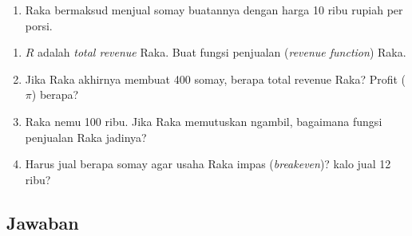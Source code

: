 \documentclass[
  letterpaper,
  DIV=11,
  numbers=noendperiod]{scrartcl}
\providecommand{\tightlist}{%
  \setlength{\itemsep}{0pt}\setlength{\parskip}{0pt}}\usepackage{longtable,booktabs,array}
\begin{document}
\begin{enumerate}
\def\labelenumi{\arabic{enumi}.}
\setcounter{enumi}{1}
\tightlist
\item
  Raka bermaksud menjual somay buatannya dengan harga 10 ribu rupiah per
  porsi.
\end{enumerate}

\begin{enumerate}
\def\labelenumi{\alph{enumi}.}
\tightlist
\item
  \(R\) adalah \emph{total revenue} Raka. Buat fungsi penjualan
  (\emph{revenue function}) Raka.
\item
  Jika Raka akhirnya membuat 400 somay, berapa total revenue Raka?
  Profit (\(\pi\)) berapa?
\item
  Raka nemu 100 ribu. Jika Raka memutuskan ngambil, bagaimana fungsi
  penjualan Raka jadinya?
\item
  Harus jual berapa somay agar usaha Raka impas (\emph{breakeven})? kalo
  jual 12 ribu?
\end{enumerate}

\hypertarget{jawaban}{%
\subsection{Jawaban}\label{jawaban}}
\end{document}

